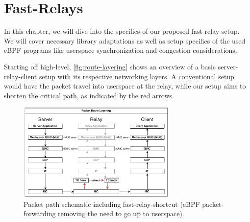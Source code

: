 
\chapter{Fast-Relays}\label{chap:fast_relays}

In this chapter, we will dive into the specifics of our proposed fast-relay setup.
We will cover necessary library adaptations as well as setup specifics of the used 
eBPF programs like userspace synchronization and congestion considerations.

Starting off high-level, \autoref{fig:route-layering} shows an overview of a basic 
server-relay-client setup with its respective networking layers.
A conventional setup would have the packet travel into userspace at the relay, 
while our setup aims to shorten the critical path, as indicated by the red arrows.

\vspace{0.5cm}
\begin{figure}[htbp] %
    \centering
    \includegraphics[width=0.7\textwidth]{figures/03_fast_relays/route-layering.drawio.pdf}
    \caption[Packet path schematic regarding network stack]{Packet path schematic including 
    fast-relay-shortcut (eBPF packet-forwarding removing the need to go up to userspace).}\label{fig:route-layering}
\end{figure}









